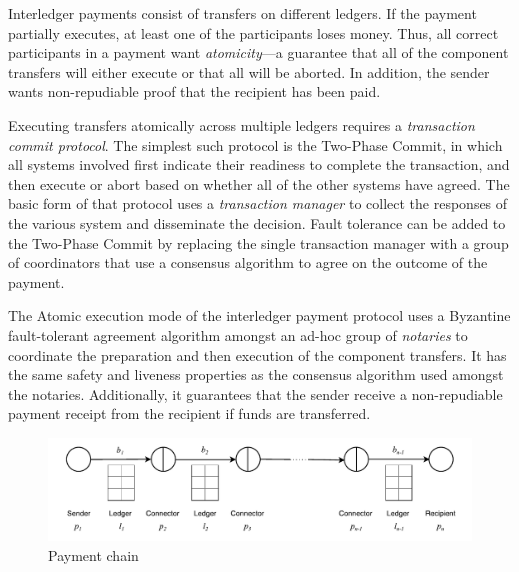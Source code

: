 \documentclass[letterpaper,twocolumn,10pt]{article}
\begin{document}



Interledger payments consist of transfers on different ledgers. If the payment partially executes, at least one of the participants loses money. Thus, all correct participants in a payment want \textit{atomicity}---a guarantee that all of the component transfers will either execute or that all will be aborted. In addition, the sender wants non-repudiable proof that the recipient has been paid.

Executing transfers atomically across multiple ledgers requires a \textit{transaction commit protocol}. The simplest such protocol is the Two-Phase Commit, in which all systems involved first indicate their readiness to complete the transaction, and then execute or abort based on whether all of the other systems have agreed. The basic form of that protocol uses a \textit{transaction manager} to collect the responses of the various system and disseminate the decision. Fault tolerance can be added to the Two-Phase Commit by replacing the single transaction manager with a group of coordinators that use a consensus algorithm to agree on the outcome of the payment. \cite{gray2006consensus}

The Atomic execution mode of the interledger payment protocol uses a Byzantine fault-tolerant agreement algorithm amongst an ad-hoc group of \textit{notaries} to coordinate the preparation and then execution of the component transfers. It has the same safety and liveness properties as the consensus algorithm used amongst the notaries. Additionally, it guarantees that the sender receive a non-repudiable payment receipt from the recipient if funds are transferred.

\begin{figure}[th!]
    \centering
    \includegraphics[width=\textwidth]{figures/payment-chain.pdf}
    \caption{Payment chain}
    \label{fig:n-bells}
\end{figure}
\end{document}
